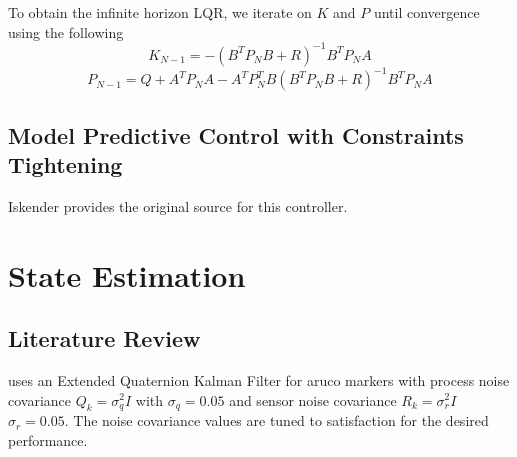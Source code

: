 \documentclass{article}
\begin{document}
To obtain the infinite horizon LQR, we iterate on $K$ and $P$ until convergence using the following
$$K_{N-1} = - (B^T P_{N} B + R)^{-1} B^T P_{N} A $$
$$P_{N-1} = Q + A^T P_{N} A - A^T P_{N}^T B(B^T P_{N} B + R)^{-1} B^T P_{N} A$$

\subsection{Model Predictive Control with Constraints Tightening}
Iskender \cite{2018_Iskender} provides the original source for this controller.

\section{State Estimation}
\subsection{Literature Review}
\cite{2017_Tordal} uses an Extended Quaternion Kalman Filter for aruco markers with process noise covariance 
$Q_k = \sigma_q ^ 2 I$ with $\sigma_q = 0.05$ and sensor noise covariance $R_k = \sigma_r^2 I$ $\sigma_r = 0.05$.
The noise covariance values are tuned to satisfaction for the desired performance.
\printbibliography
\end{document}
